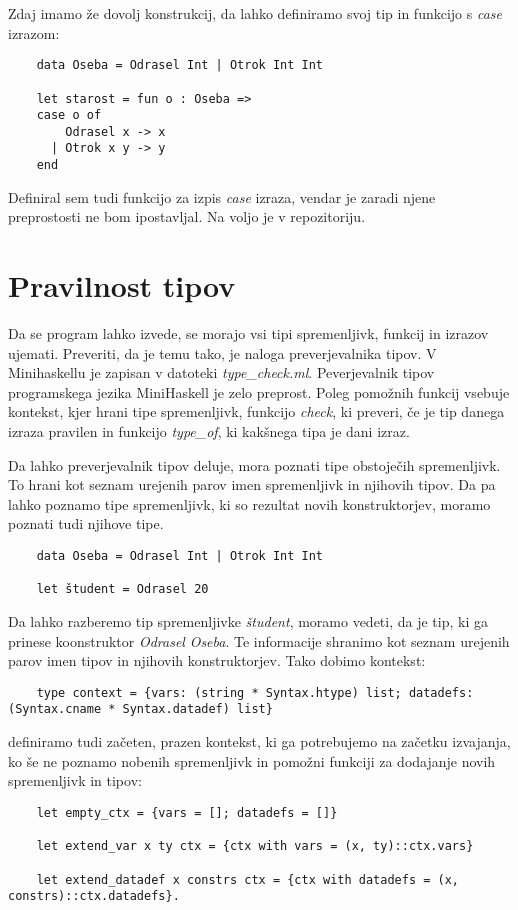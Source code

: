 \documentclass[12pt,a4paper,openany]{book}
\begin{document}
Zdaj imamo že dovolj konstrukcij, da lahko definiramo svoj tip in funkcijo s \emph{case} izrazom: 
\begin{lstlisting}
	data Oseba = Odrasel Int | Otrok Int Int

	let starost = fun o : Oseba => 
	case o of 
	    Odrasel x -> x 
	  | Otrok x y -> y
	end
\end{lstlisting}

Definiral sem tudi funkcijo za izpis \emph{case} izraza, vendar je zaradi njene preprostosti ne bom ipostavljal. Na voljo je v repozitoriju.

\section{Pravilnost tipov}
 Da se program lahko izvede, se morajo vsi tipi spremenljivk, funkcij in izrazov ujemati. Preveriti, da je temu tako, je naloga preverjevalnika tipov. V Minihaskellu je zapisan v datoteki 
 \emph{type\_check.ml}. Peverjevalnik tipov programskega jezika MiniHaskell je zelo preprost. Poleg pomožnih funkcij vsebuje kontekst, kjer hrani tipe spremenljivk, funkcijo \emph{check}, 
 ki preveri, če je tip danega izraza pravilen in funkcijo \emph{type\_of}, ki kakšnega tipa je dani izraz.
 
 Da lahko preverjevalnik tipov deluje, mora poznati tipe obstoječih spremenljivk. To hrani kot seznam urejenih parov imen spremenljivk in njihovih tipov. Da pa lahko poznamo tipe spremenljivk, 
 ki so rezultat novih konstruktorjev, moramo poznati tudi njihove tipe.
 \begin{lstlisting}
 	data Oseba = Odrasel Int | Otrok Int Int

	let študent = Odrasel 20
\end{lstlisting}
Da lahko razberemo tip spremenljivke \emph{študent}, moramo vedeti, da je tip, ki ga prinese koonstruktor \emph{Odrasel} \emph{Oseba}. Te informacije shranimo kot seznam urejenih parov imen 
tipov in njihovih konstruktorjev. Tako dobimo kontekst:
\begin{lstlisting}
	type context = {vars: (string * Syntax.htype) list; datadefs: (Syntax.cname * Syntax.datadef) list}
\end{lstlisting}
definiramo tudi začeten, prazen kontekst, ki ga potrebujemo na začetku izvajanja, ko še ne poznamo nobenih spremenljivk in pomožni funkciji za dodajanje novih spremenljivk in tipov:
\begin{lstlisting}
	let empty_ctx = {vars = []; datadefs = []}

	let extend_var x ty ctx = {ctx with vars = (x, ty)::ctx.vars}

	let extend_datadef x constrs ctx = {ctx with datadefs = (x, constrs)::ctx.datadefs}.
\end{lstlisting}
\end{document}
